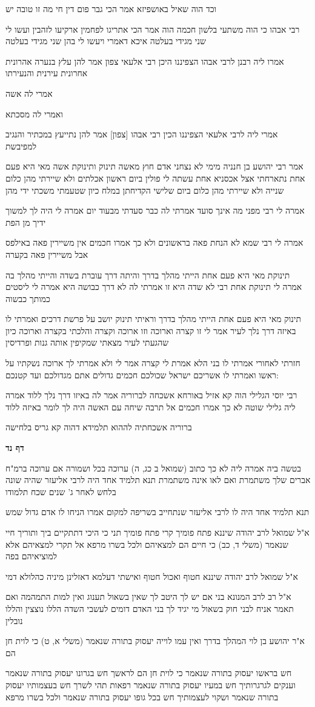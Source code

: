 \documentclass[12pt, openany]{book}
\newcommand{\sethebfont}{
\fontsize{10.5pt}{21.0pt} \selectfont
}
\newcommand{\textblock}[1]{
{\sethebfont #1\\}	
}
\newcommand{\sectname}{}
\newcommand{\newsection}[1]{
	\addcontentsline{toc}{section}{#1}
	\renewcommand{\sectname}{#1}	
	\vspace{-\baselineskip}
	\begin{center}
		\textbf{%
\fontsize{16pt}{16pt}\selectfont
			#1}
	\end{center}
	\vspace{-\baselineskip}
	\nopagebreak
}
\begin{document}
\textblock{וכד הוה שאיל באושפיזא אמר הכי גבר פום דין חי מה זו טובה יש}
\textblock{רבי אבהו כי הוה משתעי בלשון חכמה הוה אמר הכי אתריגו לפחמין ארקיעו לזהבין ועשו לי שני מגידי בעלטה איכא דאמרי ויעשו לי בהן שני מגידי בעלטה}
\textblock{אמרו ליה רבנן לרבי אבהו הצפיננו היכן רבי אלעאי צפון אמר להן עלץ בנערה אהרונית אחרונית עירנית והנעירתו}
\textblock{אמרי לה אשה}
\textblock{ואמרי לה מסכתא}
\textblock{אמרי ליה לרבי אלעאי הצפיננו הכין רבי אבהו [צפון] אמר להן נתייעץ במכתיר והנגיב למפיבשת}
\textblock{אמר רבי יהושע בן חנניה מימי לא נצחני אדם חוץ מאשה תינוק ותינוקת אשה מאי היא פעם אחת נתארחתי אצל אכסניא אחת עשתה לי פולין ביום ראשון אכלתים ולא שיירתי מהן כלום שנייה ולא שיירתי מהן כלום ביום שלישי הקדיחתן במלח כיון שטעמתי משכתי ידי מהן}
\textblock{אמרה לי רבי מפני מה אינך סועד אמרתי לה כבר סעדתי מבעוד יום אמרה לי היה לך למשוך ידיך מן הפת}
\textblock{אמרה לי רבי שמא לא הנחת פאה בראשונים ולא כך אמרו חכמים אין משיירין פאה באילפס אבל משיירין פאה בקערה}
\textblock{תינוקת מאי היא פעם אחת הייתי מהלך בדרך והיתה דרך עוברת בשדה והייתי מהלך בה אמרה לי תינוקת אחת רבי לא שדה היא זו אמרתי לה לא דרך כבושה היא אמרה לי ליסטים כמותך כבשוה}
\textblock{תינוק מאי היא פעם אחת הייתי מהלך בדרך וראיתי תינוק יושב על פרשת דרכים ואמרתי לו באיזה דרך נלך לעיר אמר לי זו קצרה וארוכה וזו ארוכה וקצרה והלכתי בקצרה וארוכה כיון שהגעתי לעיר מצאתי שמקיפין אותה גנות ופרדיסין}
\textblock{חזרתי לאחורי אמרתי לו בני הלא אמרת לי קצרה אמר לי ולא אמרתי לך ארוכה נשקתיו על ראשו ואמרתי לו אשריכם ישראל שכולכם חכמים גדולים אתם מגדולכם ועד קטנכם:}
\textblock{רבי יוסי הגלילי הוה קא אזיל באורחא אשכחה לברוריה אמר לה באיזו דרך נלך ללוד אמרה ליה גלילי שוטה לא כך אמרו חכמים אל תרבה שיחה עם האשה היה לך לומר באיזה ללוד}
\textblock{ברוריה אשכחתיה לההוא תלמידא דהוה קא גריס בלחישה}
\newsection{דף נד}
\textblock{בטשה ביה אמרה ליה לא כך כתוב (שמואל ב כג, ה) ערוכה בכל ושמורה אם ערוכה ברמ"ח אברים שלך משתמרת ואם לאו אינה משתמרת תנא תלמיד אחד היה לרבי אליעזר שהיה שונה בלחש לאחר ג' שנים שכח תלמודו}
\textblock{תנא תלמיד אחד היה לו לרבי אליעזר שנתחייב בשריפה למקום אמרו הניחו לו אדם גדול שמש}
\textblock{א"ל שמואל לרב יהודה שיננא פתח פומיך קרי פתח פומיך תני כי היכי דתתקיים ביך ותוריך חיי שנאמר (משלי ד, כב) כי חיים הם למצאיהם ולכל בשרו מרפא אל תקרי למצאיהם אלא למוציאיהם בפה}
\textblock{א"ל שמואל לרב יהודה שיננא חטוף ואכול חטוף ואישתי דעלמא דאזלינן מיניה כהלולא דמי}
\textblock{א"ל רב לרב המנונא בני אם יש לך היטב לך שאין בשאול תענוג ואין למות התמהמה ואם תאמר אניח לבני חוק בשאול מי יגיד לך בני האדם דומים לעשבי השדה הללו נוצצין והללו נובלין}
\textblock{א"ר יהושע בן לוי המהלך בדרך ואין עמו לוייה יעסוק בתורה שנאמר (משלי א, ט) כי לוית חן הם}
\textblock{חש בראשו יעסוק בתורה שנאמר כי לוית חן הם לראשך חש בגרונו יעסוק בתורה שנאמר וענקים לגרגרותיך חש במעיו יעסוק בתורה שנאמר רפאות תהי לשרך חש בעצמותיו יעסוק בתורה שנאמר ושקוי לעצמותיך חש בכל גופו יעסוק בתורה שנאמר ולכל בשרו מרפא}
\end{document}
